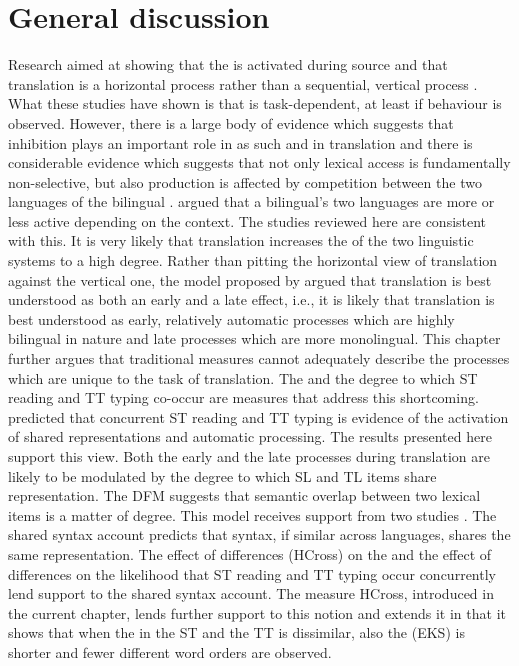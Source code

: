 \documentclass[output=paper]{LSP/langsci}
\begin{document}
\newpage 
\section{General discussion}
  
Research aimed at showing that the  is activated during source  and that translation is a horizontal process rather than a sequential, vertical process \citep{Macizo2004a,Macizo2006b,Ruiz2008Activation,Jakobsen2008a,Jensen2009Effects,WintherBalling2014a}. What these studies have shown is that  is task-dependent, at least if behaviour is observed. However, there is a large body of evidence which suggests that inhibition plays an important role in  as such \citep{Kroll2015} and in translation \citep{Macizo2010} and there is considerable evidence which suggests that not only lexical access is fundamentally non-selective, but also production is affected by competition between the two languages of the bilingual \citep{DeGroot2015}. \citet{Grosjean1997} argued that a bilingual's two languages are more or less active depending on the context. The studies reviewed here are consistent with this. It is very likely that translation increases the  of the two linguistic systems to a high degree. Rather than pitting the horizontal view of translation against the vertical one, the model proposed by \citet{Schaeffer2013Shared} argued that translation is best understood as both an early and a late effect, i.e., it is likely that translation is best understood as early, relatively automatic processes which are highly bilingual in nature and late processes which are more monolingual. This chapter further argues that traditional  measures cannot adequately describe the processes which are unique to the task of translation. The  \citep{Dragsted2008,Dragsted2010} and the degree to which ST reading and TT typing co-occur are measures that address this shortcoming.  \citet[184]{Schaeffer2013Shared} predicted that concurrent ST reading and TT typing is evidence of the activation of shared representations and automatic processing. The results presented here support this view. Both the early and the late processes during translation are likely to be modulated by the degree to which SL and TL items share representation. The DFM \citep{DeGroot1992Determinants} suggests that semantic overlap between two lexical items is a matter of degree. This model receives support from two  studies \citep{Schaeffer2016Word,SchaefferForthcoming}. The shared syntax account \citep{Hartsuiker2004} predicts that syntax, if similar across languages, shares the same representation. The effect of  differences (HCross) on the  and the effect of  differences on the likelihood that ST reading and TT typing occur concurrently lend support to the shared syntax account. The measure HCross, introduced in the current chapter, lends further support to this notion and extends it in that it shows that when the  in the ST and the TT is dissimilar, also the  (EKS) is shorter and fewer different word orders are observed. 
\end{document}
